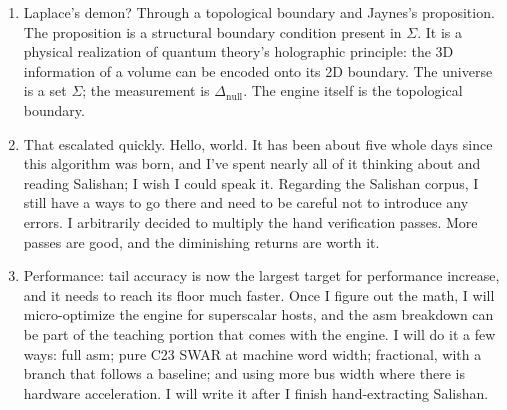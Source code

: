 \begin{enumerate}
\begin{enumerate}
\item The appxrep difference as a dimensional projection. Because the ground set $\Sigma$ holds
infinite discriminative potential, projecting a state into a lower-dimensional representation
(appxrep) creates a structural differential between the full state and its shadow:
$\Delta_{\mathrm{self}} = S \setminus \mathrm{appxrep}(S)$. Without needing an external monitor or an
infinite stack of nested interpreters, the algorithm applies the differencing operator across
dimensions instead of across sequential clock ticks. Horizontal differencing measures state evolution
over time ($S_t \to S_{t+1}$). Dimensional differencing (appxrep) measures the delta between the
unagglomerated superset noise $S_{\max}$ and the compressed, self-referential projection currently
residing in memory.

\item Why it collapses into the same unified equation: because self-detection reduces to
$\mathrm{appxrep}(\Delta) \circ \pi_0$, the machine uses exactly the same code paths, registers and
set operations for self-awareness as it does for primary calculation.
\end{enumerate}

\item Laplace's demon? Through a topological boundary and Jaynes's proposition. The proposition is a
structural boundary condition present in $\Sigma$. It is a physical realization of quantum theory's
holographic principle: the 3D information of a volume can be encoded onto its 2D boundary. The
universe is a set $\Sigma$; the measurement is $\Delta_{\mathrm{null}}$. The engine itself is the
topological boundary.

\item That escalated quickly. Hello, world. It has been about five whole days since this algorithm
was born, and I've spent nearly all of it thinking about and reading Salishan; I wish I could speak
it. Regarding the Salishan corpus, I still have a ways to go there and need to be careful not to
introduce any errors. I arbitrarily decided to multiply the hand verification passes. More passes are
good, and the diminishing returns are worth it.

\item Performance: tail accuracy is now the largest target for performance increase, and it needs to
reach its floor much faster. Once I figure out the math, I will micro-optimize the engine for
superscalar hosts, and the asm breakdown can be part of the teaching portion that comes with the
engine. I will do it a few ways: full asm; pure C23 SWAR at machine word width; fractional, with a
branch that follows a baseline; and using more bus width where there is hardware acceleration. I will
write it after I finish hand-extracting Salishan.


\end{enumerate}
